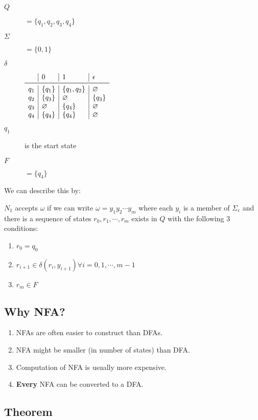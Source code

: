 \documentclass{article}
\begin{document}
\begin{description}
\item[$Q$] $=\{q_1,q_2,q_3,q_4\}$
\item[$\Sigma$] $=\{0,1\}$
\item[$\delta$]
  $\begin{array}{l|l|l|l}
  & 0 & 1 & \epsilon \\
  \midrule
  q_1 & \{q_1\} & \{q_1,q_2\} & \varnothing \\
  q_2 & \{q_3\} & \varnothing & \{q_3\} \\
  q_3 & \varnothing & \{q_4\} & \varnothing \\
  q_4 & \{q_4\} & \{q_4\} & \varnothing \\
  \end{array}$
\item[$q_1$] is the start state
\item[$F$] $=\{q_4\}$
\end{description}

We can describe this by:

$N_1$ accepts $\omega$ if we can write $\omega=y_1y_2\cdots{}y_m$
where each $y_i$ is a member of $\Sigma_\epsilon$ and there is a
sequence of states $r_0,r_1,\cdots,r_m$ exists in $Q$ with the
following 3 conditions:

\begin{enumerate}
\item $r_0=q_0$
\item $r_{i+1}\in \delta(r_i,y_{i+1}) \forall i=0,1,\cdots,m-1$
\item $r_m\in{}F$
\end{enumerate}

\subsection*{Why NFA?}

\begin{enumerate}
\item NFAs are often easier to construct than DFAs.
\item NFA might be smaller (in number of states) than DFA.
\item Computation of NFA is usually more expensive.
\item \textbf{Every} NFA can be converted to a DFA.
\end{enumerate}

\subsection*{Theorem}
\end{document}

